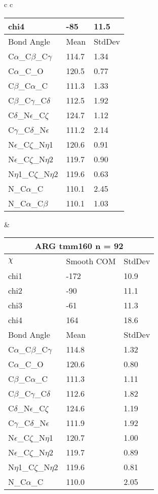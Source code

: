 \begin{longtable}{ c c }
\begin{tabular}{ l l l }
  chi4 & -85 & 11.5 \\ \midrule
  Bond Angle   & Mean     & StdDev \\ \midrule
  C$\alpha$\_C$\beta$\_C$\gamma$ & 114.7 & 1.34\\
  C$\alpha$\_C\_O & 120.5 & 0.77\\
  C$\beta$\_C$\alpha$\_C & 111.3 & 1.33\\
  C$\beta$\_C$\gamma$\_C$\delta$ & 112.5 & 1.92\\
  C$\delta$\_N$\epsilon$\_C$\zeta$ & 124.7 & 1.12\\
  C$\gamma$\_C$\delta$\_N$\epsilon$ & 111.2 & 2.14\\
  N$\epsilon$\_C$\zeta$\_N$\eta$1 & 120.6 & 0.91\\
  N$\epsilon$\_C$\zeta$\_N$\eta$2 & 119.7 & 0.90\\
  N$\eta$1\_C$\zeta$\_N$\eta$2 & 119.6 & 0.63\\
  N\_C$\alpha$\_C & 110.1 & 2.45\\
  N\_C$\alpha$\_C$\beta$ & 110.1 & 1.03\\
  \bottomrule
  \end{tabular}
  &
  \begin{tabular}{ l l l }
  \toprule
  \multicolumn{3}{c}{ARG \textbf{tmm160} n = 92} \\ \toprule
  $\chi$       & Smooth COM & StdDev \\ \midrule
  chi1 & -172 & 10.9 \\ 
  chi2 & -90 & 11.1 \\ 
  chi3 & -61 & 11.3 \\ 
  chi4 & 164 & 18.6 \\ \midrule
  Bond Angle   & Mean     & StdDev \\ \midrule
  C$\alpha$\_C$\beta$\_C$\gamma$ & 114.8 & 1.32\\
  C$\alpha$\_C\_O & 120.6 & 0.80\\
  C$\beta$\_C$\alpha$\_C & 111.3 & 1.11\\
  C$\beta$\_C$\gamma$\_C$\delta$ & 112.6 & 1.82\\
  C$\delta$\_N$\epsilon$\_C$\zeta$ & 124.6 & 1.19\\
  C$\gamma$\_C$\delta$\_N$\epsilon$ & 111.9 & 1.92\\
  N$\epsilon$\_C$\zeta$\_N$\eta$1 & 120.7 & 1.00\\
  N$\epsilon$\_C$\zeta$\_N$\eta$2 & 119.7 & 0.89\\
  N$\eta$1\_C$\zeta$\_N$\eta$2 & 119.6 & 0.81\\
  N\_C$\alpha$\_C & 110.0 & 2.05\\

\end{tabular}
\end{longtable}
